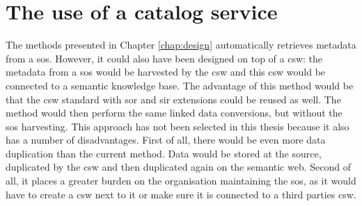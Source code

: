 \section*{The use of a catalog service}
The methods presented in Chapter \ref{chap:design} automatically retrieves metadata from a \ac{sos}. However, it could also have been designed on top of a \ac{csw}: the metadata from a \ac{sos} would be harvested by the \ac{csw} and this \ac{csw} would be connected to a semantic knowledge base. The advantage of this method would be that the \ac{csw} standard with \ac{sor} and \ac{sir} extensions could be reused as well. The method would then perform the same linked data conversions, but without the \ac{sos} harvesting. This approach has not been selected in this thesis because it also has a number of disadvantages. First of all, there would be even more data duplication than the current method. Data would be stored at the source, duplicated by the \ac{csw} and then duplicated again on the semantic web. Second of all, it places a greater burden on the organisation maintaining the \ac{sos}, as it would have to create a \ac{csw} next to it or make sure it is connected to a third parties \ac{csw}.  